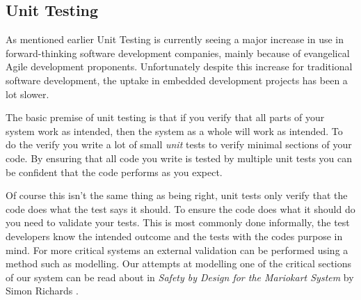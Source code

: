 \subsection{Unit Testing}
  
  As mentioned earlier Unit Testing is currently seeing a major increase in use
  in forward-thinking software development companies, mainly because of
  evangelical Agile development proponents.  Unfortunately despite this increase
  for traditional software development, the uptake in embedded development
  projects has been a lot slower.

  The basic premise of unit testing is that if you verify that all parts of your
  system work as intended, then the system as a whole will work as intended.  To
  do the verify you write a lot of small \emph{unit} tests to verify minimal
  sections of your code.  By ensuring that all code you write is tested by
  multiple unit tests you can be confident that the code performs as you expect.

  Of course this isn't the same thing as being right, unit tests only verify
  that the code does what the test says it should.  To ensure the code does what
  it should do you need to validate your tests.  This is most commonly done
  informally, the test developers know the intended outcome and the tests with
  the codes purpose in mind.  For more critical systems an external validation
  can be performed using a method such as modelling.  Our attempts at modelling
  one of the critical sections of our system can be read about in \emph{Safety
  by Design for the Mariokart System} by Simon Richards \cite{Richards_2011}.

